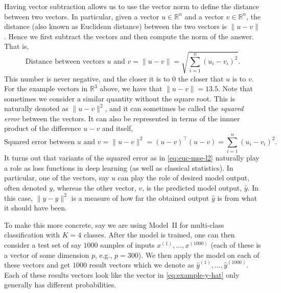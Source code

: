 Having vector subtraction allows us to use the vector norm to define the distance between two vectors. In particular, given a vector $u \in {\mathbb R}^n$ and a vector $v \in {\mathbb R}^n$, the distance (also known as Euclidean distance) between the two vectors is $\|u-v\|$. Hence we first subtract the vectors and then compute the norm of the answer. That is,
%
\begin{equation}
\label{eq:euc-distance}
\textrm{Distance between vectors $u$ and $v$} =
\| u - v\| = \sqrt{\sum_{i=1}^n (u_i - v_i)^2}.
\end{equation}
%
This number is never negative, and the closer it is to $0$ the closer that $u$ is to $v$. For the example vectors in ${\mathbb R}^3$ above, we have that $\|u-v\| = 13.5$. Note that sometimes we consider a similar quantity without the square root. This is naturally denoted as $\|u-v\|^2$, and it can sometimes be called the {\em squared error} between the vectors. It can also be represented in terms of the innner product of the difference $u-v$ and itself,
%
\begin{equation}
\label{eq:euc-mse-l2}
\textrm{Squared error between $u$ and $v$} =
\| u - v\|^2 = (u-v)^\top(u-v) = \sum_{i=1}^n (u_i - v_i)^2.
\end{equation}
%
It turns out that variants of the squared error as in \eqref{eq:euc-mse-l2} naturally play a role as loss functions in deep learning (as well as classical statistics). In particular, one of the vectors, say $u$ can play the role of desired model output, often denoted $y$, whereas the other vector, $v$, is the predicted model output, $\hat{y}$. In this case, $\|y - \hat{y}\|^2$ is a measure of how far the obtained output $\hat{y}$ is from what it should have been. 

To make this more concrete, say we are using Model~II for multi-class classification with $K=4$ classes. After the model is trained, one can then consider a test set of say $1000$ samples of inputs $x^{(1)},\ldots,x^{(1000)}$ (each of these is a vector of some dimension $p$, e.g., $p=300$). We then apply the model on each of these vectors and get $1000$ result vectors which we denote as  $\hat{y}^{(1)}, \ldots, \hat{y}^{(1000)}$. Each of these results vectors look like the vector in \eqref{eq:example-y-hat} only generally has different probabilities.


